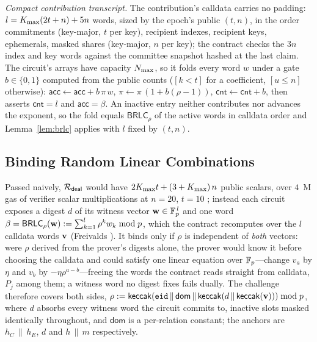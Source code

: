 \emph{Compact contribution transcript.}\label{subsec:compact} The contribution's calldata carries no padding: $l = K_{\max}(2t+n) + 5n$ words, sized by the epoch's public $(t, n)$, in the order commitments (key-major, $t$ per key), recipient indexes, recipient keys, ephemerals, masked shares (key-major, $n$ per key); the contract checks the $3n$ index and key words against the committee snapshot hashed at the last claim. The circuit's arrays have capacity $N_{\max}$, so it folds every word $w$ under a gate $b \in \{0,1\}$ computed from the public counts ($[k < t]$ for a coefficient, $[u \le n]$ otherwise): $\mathsf{acc} \leftarrow \mathsf{acc} + b\,\pi\,w$, $\pi \leftarrow \pi\,(1 + b(\rho - 1))$, $\mathsf{cnt} \leftarrow \mathsf{cnt} + b$, then asserts $\mathsf{cnt} = l$ and $\mathsf{acc} = \beta$. An inactive entry neither contributes nor advances the exponent, so the fold equals $\mathsf{BRLC}_\rho$ of the active words in calldata order and Lemma~\ref{lem:brlc} applies with $l$ fixed by $(t, n)$.

\subsection{Binding Random Linear Combinations}
\label{subsec:brlc}

Passed naively, $\mathcal{R}_{\mathsf{deal}}$ would have $2K_{\max} t + (3+K_{\max})\,n$ public scalars, over $4$~M gas of verifier scalar multiplications at $n = 20$, $t = 10$ \cite{eip1108}; instead each circuit exposes a digest $d$ of its witness vector $\mathbf{w} \in \mathbb{F}_p^{\,l}$ and one word $\beta = \mathsf{BRLC}_\rho(\mathbf{w}) := \sum_{k=1}^{l} \rho^{k} w_k \bmod p$, which the contract recomputes over the $l$ calldata words $\mathbf{v}$ (Freivalds \cite{freivalds1977probabilistic}). It binds only if $\rho$ is independent of \emph{both} vectors: were $\rho$ derived from the prover's digests alone, the prover would know it before choosing the calldata and could satisfy one linear equation over $\mathbb{F}_p$---change $v_a$ by $\eta$ and $v_b$ by $-\eta\rho^{a-b}$---freeing the words the contract reads straight from calldata, $P_j$ among them; a witness word no digest fixes fails dually. The challenge therefore covers both sides, $\rho := \mathsf{keccak}(\mathtt{eid}\,\|\,\mathsf{dom}\,\|\,\mathsf{keccak}(d\,\|\,\mathsf{keccak}(\mathbf{v}))) \bmod p$, where $d$ absorbs every witness word the circuit commits to, inactive slots masked identically throughout, and $\mathsf{dom}$ is a per-relation constant; the anchors are $h_C\,\|\,h_E$, $d$ and $h\,\|\,m$ respectively.

